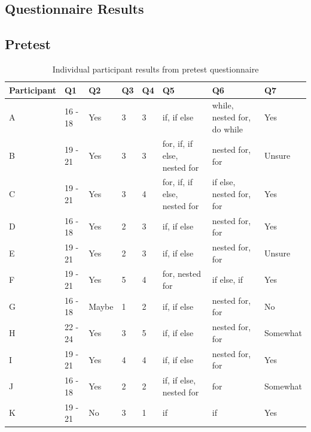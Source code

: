 \documentclass[a4paper,11.5pt]{report}
\numberwithin{figure}{section}
\numberwithin{table}{section}
\numberwithin{equation}{section}
\numberwithin{equation}{section}
\begin{document}
\begin{landscape}

\chapter{Questionnaire Results} \label{app:questionnaires}



\section{Pretest}

\begin{table}[H]
\centering
\caption{Individual participant results from pretest questionnaire}
\label{tab:pretestresults}
\begin{tabular}{|l|l|l|l|l|l|l|l|} 
 \hline        Participant & Q1 & Q2 & Q3 & Q4 & Q5 & Q6 & Q7 \\ \hline


A &16 - 18	&Yes	&3	&3	&if, if else	&while, nested for, do while	&Yes
\\ \hline
B &19 - 21	&Yes	&3	&3	&for, if, if else, nested for	&nested for, for	&Unsure
\\ \hline
C &19 - 21	&Yes	&3	&4	&for, if, if else, nested for	&if else, nested for, for	&Yes
\\ \hline
D &16 - 18	&Yes	&2	&3	&if, if else	& nested for, for	&Yes
\\ \hline
E &19 - 21	&Yes	&2	&3	&if, if else	&nested for, for	& Unsure
\\ \hline
F &19 - 21	&Yes	&5	&4	&for, nested for	&if else, if	&Yes
\\ \hline
G&16 - 18	&Maybe	&1	&2	&if, if else	&nested for, for	&No
\\ \hline
H&22 - 24	&Yes	&3	&5	&if, if else	&nested for, for	&Somewhat
\\ \hline
I&19 - 21	&Yes	&4	&4	&if, if else	&nested for, for	&Yes
\\ \hline
J&16 - 18	&Yes	&2	&2	&if, if else, nested for	&for	&Somewhat
\\ \hline
K&19 - 21	&No	&3	&1	&if	&if	&Yes
\\ \hline
\end{tabular}
\end{table}



\end{landscape}
\end{document}
